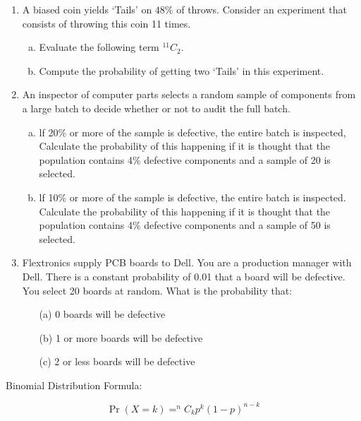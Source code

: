 \documentclass[a4paper,12pt]{article}
\begin{document}
\begin{enumerate}
\item A biased coin yields `Tails' on $48\%$ of throws. Consider an experiment that consists of throwing this coin 11 times.
\begin{enumerate}[(a)]
	\item Evaluate the following term $^{11}C_2$.
	\item Compute the probability of getting two `Tails' in this experiment.
\end{enumerate}

\newpage

\item 
An inspector of computer parts selects a random sample of components
from a large batch to decide whether or not to audit the full batch.

\begin{enumerate}[(a)]
	\item lf 20\% or more of the sample is defective, the entire batch is
	inspected, Calculate the probability of this happening if it is
	thought that the population contains 4\% defective components and
	a sample of 20 is selected.
	\item lf 10\% or more of the sample is defective, the entire batch is
	inspected. Calculate the probability of this happening if it is
	thought that the population contains 4\% defective components and
	a sample of 50 is selected.
	
\end{enumerate}


\item	Flextronics supply PCB boards to Dell.  You are a production manager with Dell.  There is a constant probability of 0.01 that a board will be defective.  You select 20 boards at random.  What is the probability that:
\begin{itemize}
	\item[(a)]	0 boards will be defective
	\item[(b)]	1 or more boards will be defective
	\item[(c)]	2 or less boards will be defective			

\end{itemize}

	\end{enumerate}
\begin{framed}
\noindent Binomial Distribution Formula:

\[\Pr(X = k) = ^nC_k p^k
(1 - p)^{n-k}\]	
\end{framed}
	
\end{document}
